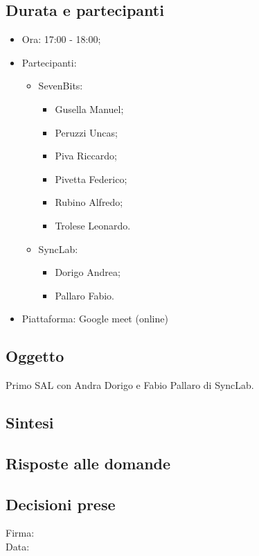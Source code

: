 \documentclass[12pt]{article}
\begin{document}
\subsection{Durata e partecipanti}
\begin{itemize}
\item Ora: 17:00 - 18:00;
\item Partecipanti: 	
	\begin{itemize}
        \item SevenBits:
        \begin{itemize}
			\item Gusella Manuel;
			\item Peruzzi Uncas;
			\item Piva Riccardo;
			\item Pivetta Federico;
			\item Rubino Alfredo;
			\item Trolese Leonardo.
		\end{itemize}
		\item SyncLab:
		\begin{itemize}
			\item Dorigo Andrea;
			\item Pallaro Fabio.
		\end{itemize}
	\end{itemize}
\item Piattaforma: Google meet (online)
\end{itemize}
\subsection{Oggetto}
Primo SAL con Andra Dorigo e Fabio Pallaro di SyncLab.

\subsection{Sintesi}

\subsection{Risposte alle domande}

\subsection{Decisioni prese}

\vfill
\begin{minipage}{10cm}
Firma: \hrulefill \\
\vspace{2mm}
Data: \dotfill
\end{minipage}
\end{document}
